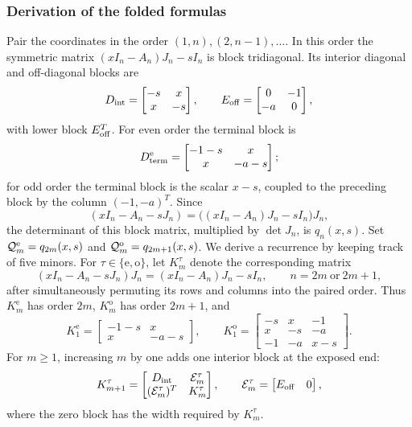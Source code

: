 \documentclass[preprints,article,accept,oneauthor]{Definitions/mdpi}
\numberwithin{equation}{section}
\theoremstyle{mdpi}
\theoremstyle{definition}
\begin{document}
\subsubsection{Derivation of the folded formulas}

Pair the coordinates in the order
\((1,n),(2,n-1),\ldots\).  In this order the symmetric matrix
\((xI_n-A_n)J_n-sI_n\) is block tridiagonal.  Its interior diagonal and
off-diagonal blocks are
\[
 D_{\rm int}=\begin{bmatrix}-s&x\\x&-s\end{bmatrix},
 \qquad
 E_{\rm off}=\begin{bmatrix}0&-1\\-a&0\end{bmatrix},
\]
with lower block \(E_{\rm off}^T\).  For even order the terminal block is
\[
 D_{\rm term}^{\rm e}=\begin{bmatrix}-1-s&x\\x&-a-s\end{bmatrix};
\]
for odd order the terminal block is the scalar \(x-s\), coupled to the
preceding block by the column \((-1,-a)^T\).  Since
\[
 (xI_n-A_n-sJ_n)=\bigl((xI_n-A_n)J_n-sI_n\bigr)J_n,
\]
the determinant of this block matrix, multiplied by \(\det J_n\), is
\(q_n(x,s)\).  Set \(\mathcal Q_m^{\rm e}=q_{2m}(x,s)\) and
\(\mathcal Q_m^{\rm o}=q_{2m+1}(x,s)\).  We derive a recurrence by keeping track of five minors.
For \(\tau\in\{\mathrm e,\mathrm o\}\), let \(K_m^\tau\) denote the
corresponding matrix
\[
 (xI_n-A_n-sJ_n)J_n=(xI_n-A_n)J_n-sI_n,
 \qquad n=2m\ \text{or}\ 2m+1,
\]
after simultaneously permuting its rows and columns into the paired
order.  Thus \(K_m^{\mathrm e}\) has order \(2m\),
\(K_m^{\mathrm o}\) has order \(2m+1\), and
\[
 K_1^{\mathrm e}=
 \begin{bmatrix}-1-s&x\\x&-a-s\end{bmatrix},
 \qquad
 K_1^{\mathrm o}=
 \begin{bmatrix}
 -s&x&-1\\
 x&-s&-a\\
 -1&-a&x-s
 \end{bmatrix}.
\]
For \(m\geq1\), increasing \(m\) by one adds one interior block at the
exposed end:
\begin{equation}\label{eq:fold-block-extension}
 K_{m+1}^\tau=
 \begin{bmatrix}
  D_{\rm int}&\mathcal E_m^\tau\\
  (\mathcal E_m^\tau)^T&K_m^\tau
 \end{bmatrix},
 \qquad
 \mathcal E_m^\tau=
 \begin{bmatrix}E_{\rm off}&0\end{bmatrix},
\end{equation}
where the zero block has the width required by \(K_m^\tau\).
\end{document}
